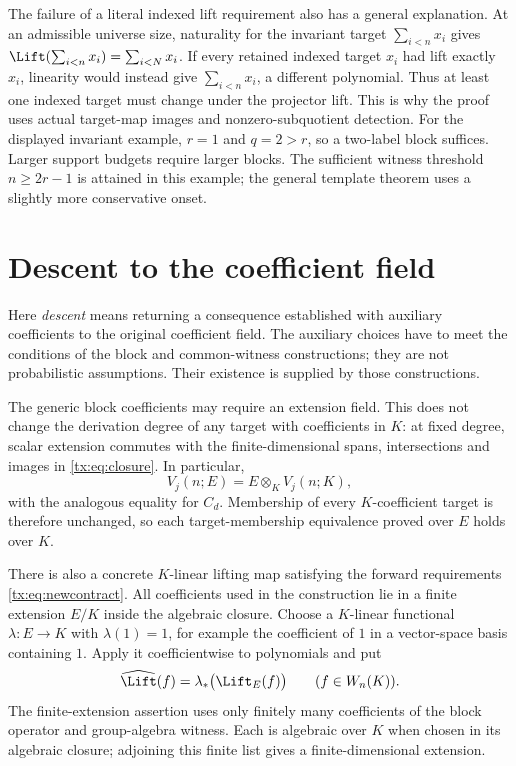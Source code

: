 \documentclass[11pt,a4paper,oneside,openany]{book}
\theoremstyle{definition}\newtheorem{definition}[theorem]{Definition}
\theoremstyle{remark}\newtheorem{remark}[theorem]{Remark}
\numberwithin{equation}{chapter}
\begin{document}
The failure of a literal indexed lift requirement also has a general
explanation. At an admissible universe size, naturality for the invariant target
$\sum_{i<n}x_i$ gives
$\Lift(\sum_{i<n}x_i)=\sum_{i<N}x_i$. If every retained indexed
target $x_i$ had lift exactly $x_i$, linearity would instead give
$\sum_{i<n}x_i$, a different polynomial. Thus at least one indexed
target must change under the projector lift. This is why the proof
uses actual target-map images and nonzero-subquotient detection.
For the displayed invariant example,
$r=1$ and $q=2>r$, so a two-label block suffices. Larger
support budgets require larger blocks. The sufficient witness threshold
$n\ge2r-1$ is attained in this example; the general template theorem
uses a slightly more conservative onset.

\section{Descent to the coefficient field}\label{tx:lift-sec:descent}
Here \emph{descent} means returning a consequence established with
auxiliary coefficients to the original coefficient field.
The auxiliary choices have to meet the conditions of the block and
common-witness constructions; they are not probabilistic assumptions.
Their existence is supplied by those constructions.

The generic block coefficients may require an extension field. This
does not change the derivation degree of any target with coefficients in $K$: at fixed degree, scalar extension
commutes with the finite-dimensional spans, intersections and images
in \eqref{tx:eq:closure}. In particular,
\[
                       V_j(n;E)=E\otimes_K V_j(n;K),
\]
with the analogous equality for $C_d$. Membership of every $K$-coefficient target is therefore unchanged,
so each target-membership equivalence proved over $E$ holds over $K$.

There is also a concrete $K$-linear lifting map satisfying the forward
requirements \eqref{tx:eq:newcontract}. All coefficients used in the
construction lie in a finite extension $E/K$ inside the algebraic
closure. Choose a $K$-linear functional $\lambda:E\to K$ with
$\lambda(1)=1$, for example the coefficient of $1$ in a vector-space
basis containing $1$. Apply it coefficientwise to polynomials and put
\begin{equation}\label{tx:lift-eq:fieldlift}
                 \widehat\Lift(f)=\lambda_*\bigl(\Lift_E(f)\bigr)
                      \qquad(f\in W_n(K)).
\end{equation}
The finite-extension assertion uses only finitely many coefficients
of the block operator and group-algebra witness. Each is algebraic
over $K$ when chosen in its algebraic closure; adjoining this finite
list gives a finite-dimensional extension.
\end{document}
